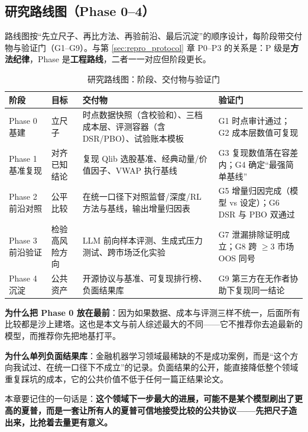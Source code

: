 \subsection{研究路线图（Phase 0--4）}

路线图按“先立尺子、再比方法、再验前沿、最后沉淀”的顺序设计，每阶段带交付物与验证门（G1--G9）。与第 \ref{sec:repro_protocol} 章 P0--P3 的关系是：P 级是\textbf{方法纪律}，Phase 是\textbf{工程路线}，二者一一对应但阶段更长。

\begin{table}[htbp]
\centering
\caption{研究路线图：阶段、交付物与验证门}
\label{tab:roadmap}
\begin{tabular}{@{}>{\raggedright\arraybackslash}p{1.5cm}>{\raggedright\arraybackslash}p{4.6cm}>{\raggedright\arraybackslash}p{4.6cm}>{\raggedright\arraybackslash}p{3.6cm}@{}}
\toprule
阶段 & 目标 & 交付物 & 验证门 \\
\midrule
Phase 0 基建 & 立尺子 & 时点数据快照（含校验和）、三档成本层、评测容器（含 DSR/PBO）、试验账本模板 & G1 时点审计通过；G2 成本层数值可复现 \\
\midrule
Phase 1 基准复现 & 对齐已知结论 & 复现 Qlib 选股基准、经典动量/价值因子、VWAP 执行基线 & G3 复现数值落在容差内；G4 确定“最强简单基线” \\
\midrule
Phase 2 前沿对照 & 公平比较 & 在统一口径下对照监督/深度/RL 方法与基线，输出增量归因表 & G5 增量归因完成（模型 vs 设定）；G6 DSR 与 PBO 双通过 \\
\midrule
Phase 3 前沿验证 & 检验高风险方向 & LLM 前向样本评测、生成式压力测试、跨市场泛化实验 & G7 泄漏排除证明成立；G8 跨 $\geq 3$ 市场 OOS 同号 \\
\midrule
Phase 4 沉淀 & 公共资产 & 开源协议与基准、可复现排行榜、负面结果库 & G9 第三方在无作者协助下复现同一结论 \\
\bottomrule
\end{tabular}
\end{table}

\textbf{为什么把 Phase 0 放在最前}：因为如果数据、成本与评测三样不统一，后面所有比较都是沙上建塔。这也是本文与前人综述最大的不同——它不推荐你去追最新的模型，而推荐你先把地基打平。

\textbf{为什么单列负面结果库}：金融机器学习领域最稀缺的不是成功案例，而是“这个方向我试过、在统一口径下不成立”的记录。负面结果的公开，能直接降低整个领域重复踩坑的成本，它的公共价值不低于任何一篇正结果论文。

本章要记住的一句话是：\textbf{这个领域下一步最大的进展，可能不是某个模型刷出了更高的夏普，而是一套让所有人的夏普可信地接受比较的公共协议——先把尺子造出来，比抢着去量更有意义。}
